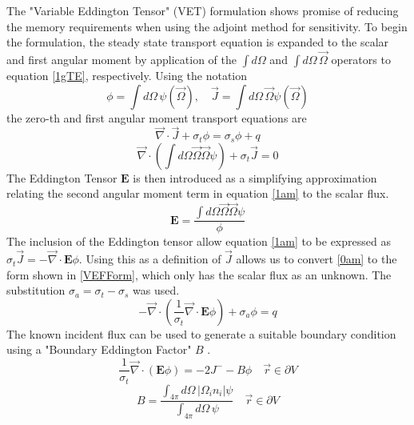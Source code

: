 \documentclass{article}
\newcommand{\vr}{\vec{r}}
\newcommand{\vO}{\vec{\Omega}}
\newcommand{\vdiv}{\vec{\nabla} \cdot}
\newcommand{\bound}{\partial V}
\newcommand{\Edd}{\mathbf{E}}
\newcommand{\sigt}{\sigma_t}
\newcommand{\sigs}{\sigma_s}
\newcommand{\siga}{\sigma_a}
\newcommand{\scalSource}{q}
\begin{document}
The "Variable Eddington Tensor" (VET) formulation shows promise of reducing the memory requirements when using the adjoint method for sensitivity. To begin the formulation, the steady state transport equation is expanded to the scalar and first angular moment by application of the $\int d \Omega$ and $\int d \Omega \, \vO$ operators to equation \ref{1gTE}, respectively. Using the notation
\begin{equation}
\phi=\int d\Omega \, \psi( \vO )
,\quad
\vec{J}= \int d\Omega \, \vO \psi( \vO )
\end{equation}
the zero-th and first angular moment transport equations are
\begin{equation}
\label{0am}
\vdiv \vec{J} + \sigt \phi = \sigs \phi + \scalSource
\end{equation}
\begin{equation}
\label{1am}
\vdiv \left(  \int d\Omega \vO \vO \psi \right) + \sigt \vec{J} =0 
\end{equation}
The Eddington Tensor $\Edd$ is then introduced as a simplifying approximation relating the second angular moment term in equation \ref{1am} to the scalar flux. 
\begin{equation}
\label{EddDef}
\Edd=\frac{\int d\Omega \vO \vO \psi}{\phi}
\end{equation}
The inclusion of the Eddington tensor allow equation \ref{1am} to be expressed as $\sigt \vec{J} = - \vdiv \Edd \phi$. Using this as a definition of $\vec{J}$ allows us to convert \ref{0am} to the form shown in \ref{VEFForm}, which only has the scalar flux as an unknown. The substitution $\siga = \sigt-\sigs$ was used.
\begin{equation}
\label{VEFForm}
- \vdiv \left( \frac{1}{\sigt}\vdiv \Edd \phi \right) + \siga \phi = \scalSource
\end{equation}
The known incident flux can be used to generate a suitable boundary condition using a "Boundary Eddington Factor" $B$ \cite{Miften}.
\begin{equation}
\frac{1}{\sigma_{t} } \vec{\nabla} \cdot \left(\Edd \phi \right)  = - 2J^- - B \phi \quad \vr \in \bound
\end{equation}
\begin{equation}
B= \frac{\int_{4 \pi} d\Omega \, \left| \Omega_i n_i \right | \psi}{\int_{4\pi} d\Omega \, \psi} \quad \vr \in \bound
\end{equation}

\end{document}
